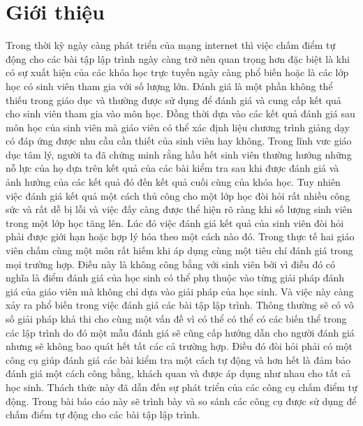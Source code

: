 \documentclass[12pt,a4paper]{article}
\author{Huu Tai}
\begin{document}
\section{Giới thiệu}
Trong thời kỳ ngày càng phát triển của mạng internet thì việc chấm điểm tự động cho các bài tập lập trình ngày càng trở nên quan trọng hơn đặc biệt là khi có sự xuất hiện của các khóa học trực tuyến ngày càng phổ biến hoặc là các lớp học có sinh viên tham gia với số lượng lớn. Đánh giá là một phần không thể thiếu trong giáo dục và thường được sử dụng để đánh giá và cung cấp kết quả cho sinh viên tham gia vào môn học. Đồng thời dựa vào các kết quả đánh giá sau môn học của sinh viên mà giáo viên có thể xác định liệu chương trình giảng dạy có đáp ứng được nhu cầu cần thiết của sinh viên hay không.\newline  
\indent Trong lĩnh vưc giáo dục tâm lý, người ta đã chứng minh rằng hầu hết sinh viên thường hướng những nỗ lực của họ dựa trên kết quả của các bài kiểm tra sau khi được đánh giá và ảnh hưởng của các kết quả đó đến kết quả cuối cùng của khóa học. Tuy nhiên việc đánh giá kết quả một cách thủ công cho một lớp học đòi hỏi rất nhiều công sức và rất dễ bị lỗi và việc đấy càng được thể hiện rõ ràng khi số lượng sinh viên trong một lớp học tăng lên. Lúc đó việc đánh giá kết quả của sinh viên đòi hỏi phải được giới hạn hoặc hợp lý hóa theo một cách nào đó.\newline
\indent Trong thực tế hai giáo viên chấm cùng một môn rất hiếm khi áp dụng cùng một tiêu chí đánh giá trong mọi trường hợp. Điều này là không công bằng với sinh viên bởi vì điều đó có nghĩa là điểm đánh giá của học sinh có thể phụ thuộc vào từng giải pháp đánh giá của giáo viên mà không chỉ dựa vào giải pháp của học sinh. Và việc này càng xảy ra phổ biến trong việc đánh giá các bài tập lập trình.\newline
\indent Thông thường sẽ có vô số giải pháp khả thi cho cùng một vấn đề vì có thể có thể có các biến thể trong các lập trình do đó một mẫu đánh giá sẽ cũng cấp hướng dẫn cho người đánh giá nhưng sẽ không bao quát hết tất các cả trường hợp. Điều đó đòi hỏi phải có một công cụ giúp đánh giá các bài kiểm tra một cách tự động và hơn hết là đảm bảo đánh giá một cách công bằng, khách quan và được áp dụng như nhau cho tất cả học sinh.\newline
\indent Thách thức này đã dẫn đến sự phát triển của các công cụ chấm điểm tự động. Trong bài báo cáo này sẽ trình bày và so sánh các công cụ được sử dụng để chấm điểm tự động cho các bài tập lập trình.\newline
\end{document}
